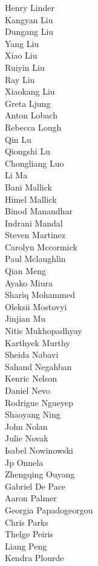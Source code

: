 Henry Linder\\
Kangyan Liu\\
Dungang Liu\\
Yang Liu\\
Xiao Liu\\
Ruiyin Liu\\
Ray Liu\\
Xiaokang  Liu\\
Greta Ljung\\
Anton Lobach\\
Rebecca Lough\\
Qin Lu\\
Qiongshi Lu\\
Chongliang Luo\\
Li Ma\\
Bani Mallick\\
Himel Mallick\\
Binod Manandhar\\
Indrani Mandal\\
Steven  Martinez\\
Carolyn Mccormick\\
Paul Mclaughlin\\
Qian Meng\\
Ayako Miura\\
Shariq Mohammed\\
Oleksii Mostovyi\\
Jinjian Mu\\
Nitis Mukhopadhyay\\
Karthyek Murthy\\
Sheida Nabavi\\
Sahand Negahban\\
Kenric Nelson\\
Daniel Nevo\\
Rodrigue Ngueyep\\
Shaoyang Ning\\
John Nolan\\
Julie Novak\\
Isabel Nowinowski\\
Jp Onnela\\
Zhengqing Ouyang\\
Gabriel De Pace\\
Aaron Palmer\\
Georgia Papadogeorgou\\
Chris Parks\\
Thelge Peiris\\
Liang Peng\\
Kendra Plourde\\
